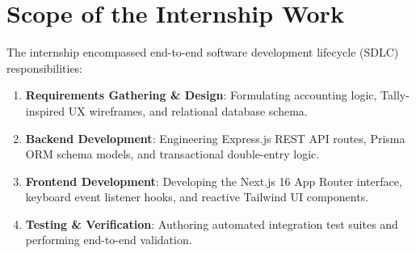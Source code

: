 \section{Scope of the Internship Work}
The internship encompassed end-to-end software development lifecycle (SDLC) responsibilities:
\begin{enumerate}
    \item \textbf{Requirements Gathering \& Design}: Formulating accounting logic, Tally-inspired UX wireframes, and relational database schema.
    \item \textbf{Backend Development}: Engineering Express.js REST API routes, Prisma ORM schema models, and transactional double-entry logic.
    \item \textbf{Frontend Development}: Developing the Next.js 16 App Router interface, keyboard event listener hooks, and reactive Tailwind UI components.
    \item \textbf{Testing \& Verification}: Authoring automated integration test suites and performing end-to-end validation.
\end{enumerate}
